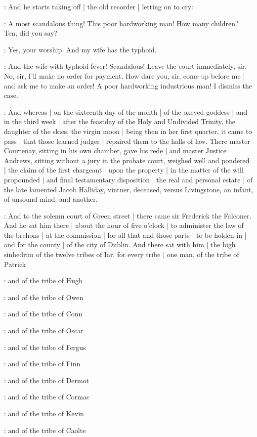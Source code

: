 \Nq:
And he starts taking off |
the old recorder |
letting on to cry:

\bergan:
A most scandalous thing!
This poor hardworking man!
How many children?
Ten,
did you say?

\bergan:
Yes,
your worship.
And my wife has the typhoid.

\bergan:
And the wife with typhoid fever!
Scandalous!
Leave the court immediately,
sir.
No,
sir,
I'll make no order for payment.
How dare you,
sir,
come up before me |
and ask me to make an order!
A poor hardworking industrious man!
I dismiss the case.

:
And whereas |
on the sixteenth day of the month |
of the oxeyed goddess |
and in the third week |
after the feastday of the Holy and Undivided Trinity,
the daughter of the skies,
the virgin moon |
being then in her first quarter,
it came to pass |
that those learned judges |
repaired them to the halls of law.
There master Courtenay,
sitting in his own chamber,
gave his rede |
and master Justice Andrews,
sitting without a jury in the probate court,
weighed well and pondered |
the claim of the first chargeant |
upon the property |
in the matter of the will propounded |
and final testamentary disposition |
 the real and personal estate |
of the late lamented Jacob Halliday,
vintner,
deceased,
versus Livingstone,
an infant,
of unsound mind,
and another.

:
And to the solemn court of Green street |
there came sir Frederick the Falconer.
And he sat him there |
about the hour of five o'clock |
to administer the law of the brehons |
at the commission |
for all that and those parts |
to be holden in |
and for the county |
of the city of Dublin.
And there sat with him |
the high sinhedrim of the twelve tribes of Iar,
for every tribe |
one man,
of the tribe of Patrick

:
and of the tribe of Hugh

:
and of the tribe of Owen

:
and of the tribe of Conn

:
and of the tribe of Oscar

:
and of the tribe of Fergus

:
and of the tribe of Finn

:
and of the tribe of Dermot

:
and of the tribe of Cormac

:
and of the tribe of Kevin

:
and of the tribe of Caolte

